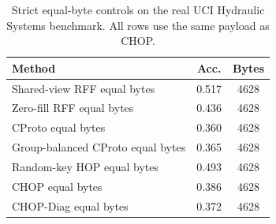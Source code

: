 \begin{table}[t]
\centering
\caption{Strict equal-byte controls on the real UCI Hydraulic Systems benchmark. All rows use the same payload as CHOP.}
\label{tab:strict-equal-byte-hydraulic}
\begin{tabular}{lcc}
\toprule
Method & Acc. & Bytes \\
\midrule
Shared-view RFF equal bytes & 0.517 & 4628 \\
Zero-fill RFF equal bytes & 0.436 & 4628 \\
CProto equal bytes & 0.360 & 4628 \\
Group-balanced CProto equal bytes & 0.365 & 4628 \\
Random-key HOP equal bytes & 0.493 & 4628 \\
CHOP equal bytes & 0.386 & 4628 \\
CHOP-Diag equal bytes & 0.372 & 4628 \\
\bottomrule
\end{tabular}
\end{table}
